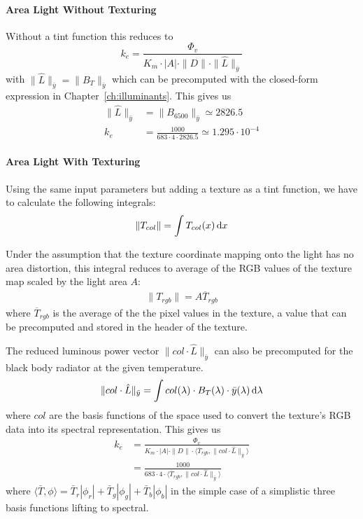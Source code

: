 \paragraph{Area Light Without Texturing} Without a tint function this reduces to
\begin{displaymath}
k_e = \frac{\Phi_v}{K_m \cdot |A| \cdot \|D\| \cdot \|\hat{L}\|_{\bar y} }
\end{displaymath}
with $\|\hat{L}\|_{\bar y} = \|B_T\|_{\bar y}$ which can be precomputed with the
closed-form expression in Chapter~\ref{ch:illuminants}. This gives us
\begin{align*}
\|\hat{L}\|_{\bar y} &= \|B_{6500}\|_{\bar y} \simeq 2826.5 \\
k_e &= \frac{1000}{683 \cdot 4 \cdot 2826.5 } \simeq 1.295 \cdot 10^{-4}
\end{align*}

\paragraph{Area Light With Texturing}
Using the same input parameters but adding a texture as a tint function,
we have to calculate the following integrals:
\begin{displaymath}
\|T_{col}\| = \int T_{col}(x) \mathop{}\!\mathrm{d} x
\end{displaymath}

Under the assumption that the texture coordinate mapping onto the light has no area
distortion, this integral reduces to average of the \gls{RGB} values of the
texture map scaled by the light area $A$:
\begin{align*}
\|T_{rgb}\| = A \overline{T}_{rgb}
\end{align*}
where $\overline{T}_{rgb}$ is the average of the the pixel values in the
texture,
a value that can be precomputed and stored in the header of the texture.

The reduced luminous power vector $\|col\cdot \hat L\|_{\bar y}$ can also
be precomputed for the black body radiator at the given temperature.
\begin{displaymath}
\|col\cdot \hat L\|_{\bar y} = \int col(\lambda) \cdot B_T(\lambda) \cdot \bar y
(\lambda) \mathop{}\!\mathrm{d}\lambda
\end{displaymath}
where $col$ are the basis functions of the space used to convert the texture's
\gls{RGB} data into its spectral representation.
This gives us
\begin{align*}
 k_e &= \frac{\Phi_v}{K_m \cdot |A| \cdot \|D\| \cdot \langle \overline{T}_{rgb}, \|col\cdot\hat{L}\|_{\bar y} \rangle } \\
&= \frac{1000}{683 \cdot 4 \cdot \langle \overline{T}_{rgb}, \|col\cdot\hat{L}\|_{\bar y} \rangle  }
\end{align*}
where $\langle \bar T, \phi \rangle = \bar T_r|\phi_r| + \bar T_g|\phi_g| + \bar T_b|\phi_b| $
in the simple case of a simplistic three basis functions lifting to spectral.

